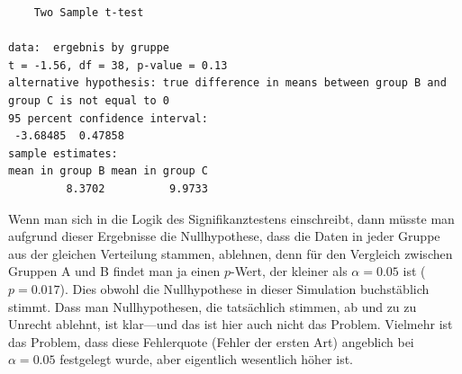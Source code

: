 \documentclass[oneside, 10pt]{book}\usepackage[]{graphicx}\usepackage[]{xcolor}
\makeatletter
\newenvironment{kframe}{%
 \def\at@end@of@kframe{}%
 \ifinner\ifhmode%
  \def\at@end@of@kframe{\end{minipage}}%
  \begin{minipage}{\columnwidth}%
 \fi\fi%
 \def\FrameCommand##1{\hskip\@totalleftmargin \hskip-\fboxsep
 \colorbox{shadecolor}{##1}\hskip-\fboxsep
     \hskip-\linewidth \hskip-\@totalleftmargin \hskip\columnwidth}%
 \MakeFramed {\advance\hsize-\width
   \@totalleftmargin\z@ \linewidth\hsize
   \@setminipage}}%
 {\par\unskip\endMakeFramed%
 \at@end@of@kframe}
\newenvironment{knitrout}{}{} %
\makeatother
\begin{document}
\begin{knitrout}
\begin{kframe}
\begin{verbatim}
	Two Sample t-test

data:  ergebnis by gruppe
t = -1.56, df = 38, p-value = 0.13
alternative hypothesis: true difference in means between group B and group C is not equal to 0
95 percent confidence interval:
 -3.68485  0.47858
sample estimates:
mean in group B mean in group C 
         8.3702          9.9733 
\end{verbatim}
\end{kframe}
\end{knitrout}

Wenn man sich in die Logik des Signifikanztestens
einschreibt, dann müsste man aufgrund dieser Ergebnisse
die Nullhypothese, dass die Daten in jeder Gruppe
aus der gleichen Verteilung stammen, ablehnen,
denn für den Vergleich zwischen Gruppen A und B
findet man ja einen $p$-Wert,
der kleiner als $\alpha = 0.05$ ist ($p = 0.017$).
Dies obwohl die Nullhypothese in dieser Simulation
buchstäblich stimmt.
Dass man Nullhypothesen, die tatsächlich stimmen,
ab und zu zu Unrecht ablehnt, ist klar---und das
ist hier auch nicht das Problem. Vielmehr ist das Problem,
dass diese Fehlerquote (Fehler der ersten Art) angeblich
bei $\alpha = 0.05$ festgelegt wurde, aber eigentlich
wesentlich höher ist.
\end{document}
